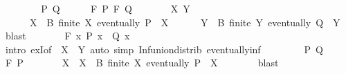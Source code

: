 \begin{isabellebody}
\ \ \isamarkupfalse%
\isanewline
\ \ \ \ \isamarkupfalse%
\ P\ Q\isanewline
\ \ \ \ \isamarkupfalse%
\ {\isachardoublequoteopen}{\isacharquery}{\kern0pt}F\ P{\isachardoublequoteclose}\ {\isachardoublequoteopen}{\isacharquery}{\kern0pt}F\ Q{\isachardoublequoteclose}\isanewline
\ \ \ \ \isamarkupfalse%
\ \isamarkupfalse%
\ X\ Y\ \isanewline
\ \ \ \ \ \ {\isachardoublequoteopen}X\ {\isasymsubseteq}\ B{\isachardoublequoteclose}\ {\isachardoublequoteopen}finite\ X{\isachardoublequoteclose}\ {\isachardoublequoteopen}eventually\ P\ {\isacharparenleft}{\kern0pt}{\isasymSqinter}\ X{\isacharparenright}{\kern0pt}{\isachardoublequoteclose}\isanewline
\ \ \ \ \ \ {\isachardoublequoteopen}Y\ {\isasymsubseteq}\ B{\isachardoublequoteclose}\ {\isachardoublequoteopen}finite\ Y{\isachardoublequoteclose}\ {\isachardoublequoteopen}eventually\ Q\ {\isacharparenleft}{\kern0pt}{\isasymSqinter}\ Y{\isacharparenright}{\kern0pt}{\isachardoublequoteclose}\ \isamarkupfalse%
\ blast\isanewline
\ \ \ \ \isamarkupfalse%
\ \isamarkupfalse%
\ {\isachardoublequoteopen}{\isacharquery}{\kern0pt}F\ {\isacharparenleft}{\kern0pt}{\isasymlambda}x{\isachardot}{\kern0pt}\ P\ x\ {\isasymand}\ Q\ x{\isacharparenright}{\kern0pt}{\isachardoublequoteclose}\isanewline
\ \ \ \ \ \ \isamarkupfalse%
\ {\isacharparenleft}{\kern0pt}intro\ exI{\isacharbrackleft}{\kern0pt}of\ {\isacharunderscore}{\kern0pt}\ {\isachardoublequoteopen}X\ {\isasymunion}\ Y{\isachardoublequoteclose}{\isacharbrackright}{\kern0pt}{\isacharparenright}{\kern0pt}\ {\isacharparenleft}{\kern0pt}auto\ simp{\isacharcolon}{\kern0pt}\ Inf{\isacharunderscore}{\kern0pt}union{\isacharunderscore}{\kern0pt}distrib\ eventually{\isacharunderscore}{\kern0pt}inf{\isacharparenright}{\kern0pt}\isanewline
\ \ \isamarkupfalse%
\isanewline
\ \ \ \ \isamarkupfalse%
\ P\ Q\isanewline
\ \ \ \ \isamarkupfalse%
\ {\isachardoublequoteopen}{\isacharquery}{\kern0pt}F\ P{\isachardoublequoteclose}\isanewline
\ \ \ \ \isamarkupfalse%
\ \isamarkupfalse%
\ X\ \ {\isachardoublequoteopen}X\ {\isasymsubseteq}\ B{\isachardoublequoteclose}\ {\isachardoublequoteopen}finite\ X{\isachardoublequoteclose}\ {\isachardoublequoteopen}eventually\ P\ {\isacharparenleft}{\kern0pt}{\isasymSqinter}\ X{\isacharparenright}{\kern0pt}{\isachardoublequoteclose}\isanewline
\ \ \ \ \ \ \isamarkupfalse%
\ blast\isanewline

\end{isabellebody}
